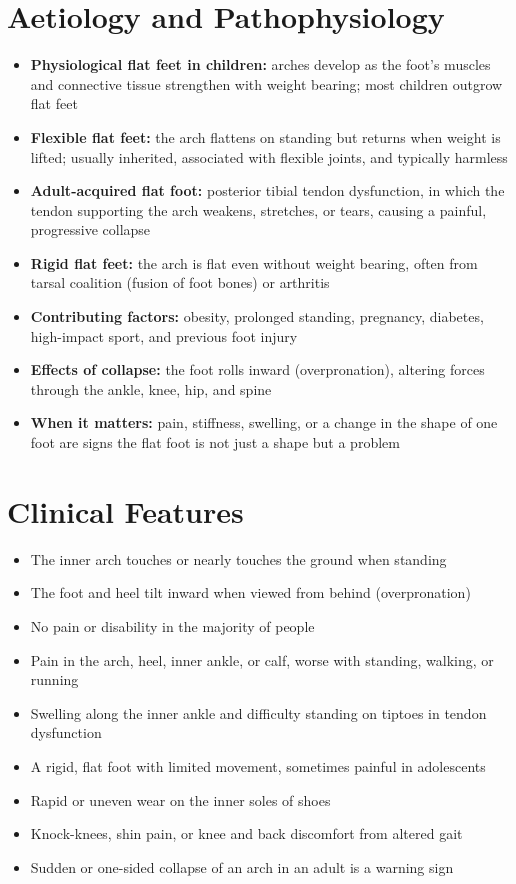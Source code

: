 \section*{Aetiology and Pathophysiology}
\begin{itemize}
    \item \textbf{Physiological flat feet in children:} arches develop as the foot's muscles and connective tissue strengthen with weight bearing; most children outgrow flat feet
    \item \textbf{Flexible flat feet:} the arch flattens on standing but returns when weight is lifted; usually inherited, associated with flexible joints, and typically harmless
    \item \textbf{Adult-acquired flat foot:} posterior tibial tendon dysfunction, in which the tendon supporting the arch weakens, stretches, or tears, causing a painful, progressive collapse
    \item \textbf{Rigid flat feet:} the arch is flat even without weight bearing, often from tarsal coalition (fusion of foot bones) or arthritis
    \item \textbf{Contributing factors:} obesity, prolonged standing, pregnancy, diabetes, high-impact sport, and previous foot injury
    \item \textbf{Effects of collapse:} the foot rolls inward (overpronation), altering forces through the ankle, knee, hip, and spine
    \item \textbf{When it matters:} pain, stiffness, swelling, or a change in the shape of one foot are signs the flat foot is not just a shape but a problem
\end{itemize}

\section*{Clinical Features}
\begin{itemize}
    \item The inner arch touches or nearly touches the ground when standing
    \item The foot and heel tilt inward when viewed from behind (overpronation)
    \item No pain or disability in the majority of people
    \item Pain in the arch, heel, inner ankle, or calf, worse with standing, walking, or running
    \item Swelling along the inner ankle and difficulty standing on tiptoes in tendon dysfunction
    \item A rigid, flat foot with limited movement, sometimes painful in adolescents
    \item Rapid or uneven wear on the inner soles of shoes
    \item Knock-knees, shin pain, or knee and back discomfort from altered gait
    \item Sudden or one-sided collapse of an arch in an adult is a warning sign
\end{itemize}

